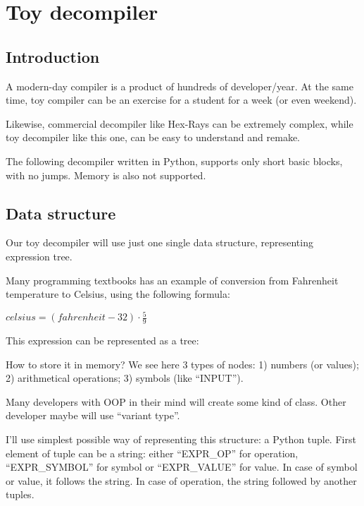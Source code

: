 ﻿\section{Toy decompiler}
\label{toy_decompiler}

\subsection{Introduction}

A modern-day compiler is a product of hundreds of developer/year.
At the same time, toy compiler can be an exercise for a student for a week (or even weekend).

Likewise, commercial decompiler like Hex-Rays can be extremely complex,
while toy decompiler like this one, can be easy to understand and remake.

The following decompiler written in Python, supports only short basic blocks, with no jumps.
Memory is also not supported.

\subsection{Data structure}

Our toy decompiler will use just one single data structure, representing expression tree.

Many programming textbooks has an example of conversion from Fahrenheit temperature to Celsius, using the following formula:

\begin{center}
{\large $celsius = (fahrenheit - 32) \cdot \frac{5}{9}$}
\end{center}

This expression can be represented as a tree:



How to store it in memory?
We see here 3 types of nodes: 1) numbers (or values); 2) arithmetical operations; 3) symbols (like ``INPUT'').

Many developers with \ac{OOP} in their mind will create some kind of class.
Other developer maybe will use ``variant type''.

I'll use simplest possible way of representing this structure: a Python tuple.
First element of tuple can be a string:
either ``EXPR\_OP'' for operation, ``EXPR\_SYMBOL'' for symbol or ``EXPR\_VALUE'' for value.
In case of symbol or value, it follows the string.
In case of operation, the string followed by another tuples.

